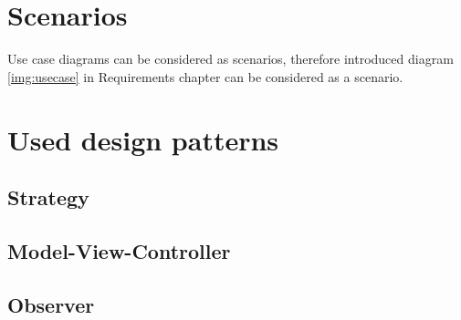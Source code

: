 \section{Scenarios}
Use case diagrams can be considered as scenarios, therefore introduced diagram \ref{img:usecase} in Requirements chapter can be considered as a scenario.

\section{Used design patterns}
\subsection{Strategy}
\subsection{Model-View-Controller}
\subsection{Observer}